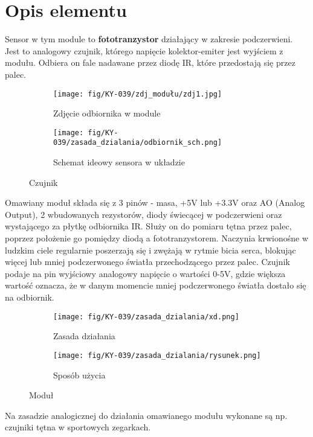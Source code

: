 \documentclass[11pt, a4paper]{article}
\author{Anna Nasierowska}
\begin{document}
\newpage

\section*{Opis elementu} 

Sensor w tym module to \textbf{fototranzystor} działający w zakresie podczerwieni. Jest to analogowy czujnik, którego napięcie kolektor-emiter jest wyjściem z modułu. Odbiera on fale nadawane przez diodę IR, które przedostają się przez palec. \\

\vspace{0.5cm}
\begin{figure}[h]
\centering
\begin{subfigure}{.5\textwidth}
  \centering
  \texttt{[image: fig/KY-039/zdj\_modułu/zdj1.jpg]}
  \caption{Zdjęcie odbiornika w module}
  \label{fig:sub1}
\end{subfigure}%
\begin{subfigure}{.5\textwidth}
  \centering
    \texttt{[image: fig/KY-039/zasada\_dzialania/odbiornik\_sch.png]}
      \caption{Schemat ideowy sensora w układzie}
  \label{zd}
\end{subfigure}
\caption{Czujnik}
\label{fig:test}
\end{figure}
\vspace{0.5cm}

Omawiany moduł składa się z 3 pinów - masa, +5V lub +3.3V oraz AO (Analog Output), 2 wbudowanych rezystorów, diody świecącej w podczerwieni oraz wystającego za płytkę odbiornika IR. Służy on do pomiaru tętna przez palec, poprzez położenie go pomiędzy diodą a fototranzystorem. Naczynia krwionośne w ludzkim ciele regularnie poszerzają się i zwężają w rytmie bicia serca, blokując więcej lub mniej podczerwonego światła przechodzącego przez palec. Czujnik podaje na pin wyjściowy analogowy napięcie o wartości 0-5V, gdzie większa wartość oznacza, że w danym momencie mniej podczerwonego światła dostało się na odbiornik. 

\vspace{0.5cm}
\begin{figure}[h]
\centering
\begin{subfigure}{.4\textwidth}
  \centering
  \texttt{[image: fig/KY-039/zasada\_dzialania/xd.png]}
  \caption{Zasada działania}
  \label{fig:sub1}
\end{subfigure}%
\begin{subfigure}{.4\textwidth}
  \centering
    \texttt{[image: fig/KY-039/zasada\_dzialania/rysunek.png]}
      \caption{Sposób użycia}
  \label{zd}
\end{subfigure}
\caption{Moduł}
\label{fig:test}
\end{figure}
\vspace{0.5cm}
Na zasadzie analogicznej do działania omawianego modułu wykonane są np. czujniki tętna w sportowych zegarkach. 
\end{document}
